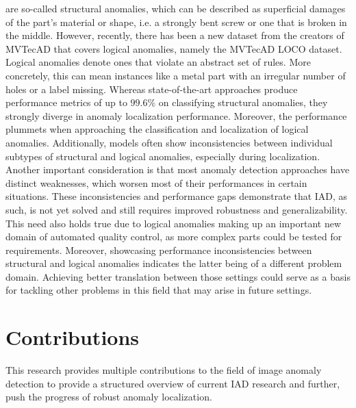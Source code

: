 are so-called structural anomalies, which can be described as superficial damages of the part's material or shape, i.e. a strongly 
bent screw or one that is broken in the middle. However, recently, there has been a new dataset from the creators of MVTecAD that covers logical 
anomalies, namely the MVTecAD LOCO \cite{LOCODentsAndScratchesBergmann2022} dataset. Logical anomalies denote ones that violate an abstract 
set of rules. More concretely, this can mean instances like a metal part with an irregular number of holes or a label missing. Whereas 
state-of-the-art approaches produce performance metrics of up to $99.6 \% $ on classifying structural anomalies, they 
strongly diverge in anomaly localization performance. Moreover, the performance plummets when approaching the classification and localization of logical 
anomalies. Additionally, models often show inconsistencies between individual subtypes of structural and logical anomalies, especially during 
localization. Another important consideration is that most anomaly detection approaches have distinct weaknesses, which worsen most 
of their performances in certain situations. These inconsistencies and performance gaps demonstrate that IAD, as such, is not yet solved and still requires improved 
robustness and generalizability. This need also holds true due to logical anomalies making up an important new domain of automated 
quality control, as more complex parts could be tested for requirements. Moreover, showcasing performance inconsistencies between 
structural and logical anomalies indicates the latter being of a different problem domain. Achieving better translation between those 
settings could serve as a basis for tackling other problems in this field that may arise in future settings.


\section{Contributions}
\label{sec:contributions}
This research provides multiple contributions to the field of image anomaly detection to provide a structured overview of current IAD research and 
further, push the progress of robust anomaly localization. 

